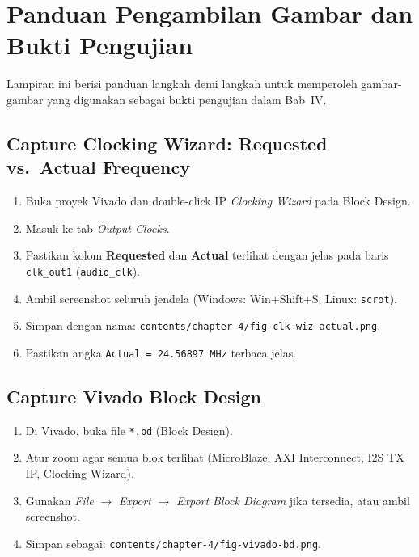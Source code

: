 
\section{Panduan Pengambilan Gambar dan Bukti Pengujian}

Lampiran ini berisi panduan langkah demi langkah untuk memperoleh
gambar-gambar yang digunakan sebagai bukti pengujian dalam Bab~IV.

\subsection{Capture Clocking Wizard: Requested vs.\ Actual Frequency}

\begin{enumerate}
  \item Buka proyek Vivado dan double-click IP \textit{Clocking Wizard} pada Block Design.
  \item Masuk ke tab \textit{Output Clocks}.
  \item Pastikan kolom \textbf{Requested} dan \textbf{Actual} terlihat dengan jelas pada baris \texttt{clk\_out1} (\texttt{audio\_clk}).
  \item Ambil screenshot seluruh jendela (Windows: Win+Shift+S; Linux: \texttt{scrot}).
  \item Simpan dengan nama: \texttt{contents/chapter-4/fig-clk-wiz-actual.png}.
  \item Pastikan angka \texttt{Actual = 24.56897~MHz} terbaca jelas.
\end{enumerate}

\subsection{Capture Vivado Block Design}

\begin{enumerate}
  \item Di Vivado, buka file \texttt{*.bd} (Block Design).
  \item Atur zoom agar semua blok terlihat (MicroBlaze, AXI Interconnect, I2S TX IP, Clocking Wizard).
  \item Gunakan \textit{File} $\rightarrow$ \textit{Export} $\rightarrow$ \textit{Export Block Diagram} jika tersedia,
        atau ambil screenshot.
  \item Simpan sebagai: \texttt{contents/chapter-4/fig-vivado-bd.png}.
\end{enumerate}

